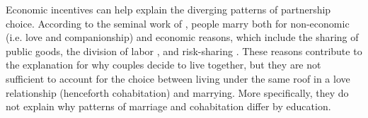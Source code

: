 \documentclass[12pt]{article}
\begin{document}
 Economic incentives can help explain the diverging patterns of partnership choice. According to the seminal work of \citet{becker1981}, people marry both for non-economic (i.e. love and companionship) and economic reasons, which include the sharing of public goods, the division of labor \citep{chiappori1997}, and risk-sharing \citep{voena2015,rigas2015}. These reasons contribute to the explanation for why couples decide to live together, but they are not sufficient to account for the choice between living under the same roof in a love relationship (henceforth cohabitation) and marrying. More specifically, they do not explain why patterns of marriage and cohabitation differ by education.

\end{document}

